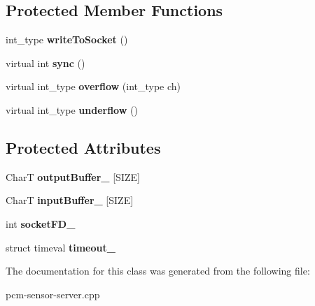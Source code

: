 \subsection*{Protected Member Functions}
\begin{DoxyCompactItemize}
\item 
\mbox{\label{classbasic__socketbuf_a026bef7f8f15c3086287f4112ea001fe}} 
int\+\_\+type {\bfseries write\+To\+Socket} ()
\item 
\mbox{\label{classbasic__socketbuf_a128b9e4f6b5e4f7532aa0ca7ac67803e}} 
virtual int {\bfseries sync} ()
\item 
\mbox{\label{classbasic__socketbuf_a31d98bec7cb1c084d4ae08bd7a98b3d1}} 
virtual int\+\_\+type {\bfseries overflow} (int\+\_\+type ch)
\item 
\mbox{\label{classbasic__socketbuf_af0883fea88b3f6061e8f338490ebda16}} 
virtual int\+\_\+type {\bfseries underflow} ()
\end{DoxyCompactItemize}
\subsection*{Protected Attributes}
\begin{DoxyCompactItemize}
\item 
\mbox{\label{classbasic__socketbuf_a72290a4a57ba4e432903e713fd498733}} 
CharT {\bfseries output\+Buffer\+\_\+} [S\+I\+ZE]
\item 
\mbox{\label{classbasic__socketbuf_a16ca6921ff4f87043be3242c0e6e74d6}} 
CharT {\bfseries input\+Buffer\+\_\+} [S\+I\+ZE]
\item 
\mbox{\label{classbasic__socketbuf_a187d779f7cf00a3a7676b661696c7c96}} 
int {\bfseries socket\+F\+D\+\_\+}
\item 
\mbox{\label{classbasic__socketbuf_a554b3f4a850663ed3f160cb7d7114c91}} 
struct timeval {\bfseries timeout\+\_\+}
\end{DoxyCompactItemize}


The documentation for this class was generated from the following file\+:\begin{DoxyCompactItemize}
\item 
pcm-\/sensor-\/server.\+cpp\end{DoxyCompactItemize}

